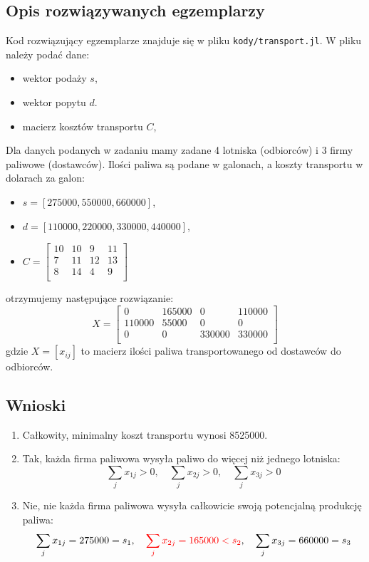 \documentclass[11pt,a4paper]{article}
\numberwithin{equation}{section}
\begin{document}
\subsection{Opis rozwiązywanych egzemplarzy}
Kod rozwiązujący egzemplarze znajduje się w pliku \texttt{kody/transport.jl}. W pliku należy podać dane: 
\begin{itemize}
    \item wektor podaży $s$,
    \item wektor popytu $d$.
    \item macierz kosztów transportu $C$,
\end{itemize}
Dla danych podanych w zadaniu mamy zadane 4 lotniska (odbiorców) i 3 firmy paliwowe (dostawców). Ilości paliwa są podane w galonach, a koszty transportu w dolarach za galon:
\begin{itemize}
    \item $s = [275000, 550000, 660000]$,
    \item $d = [110000, 220000, 330000, 440000]$,
    \item $
        C = \begin{bmatrix}
            10 &10&9&11 \\
            7&11&12&13 \\
            8&14&4&9\\
        \end{bmatrix}
        $
\end{itemize}
otrzymujemy następujące rozwiązanie:
    \[
        X = \begin{bmatrix}
            0 & 165000 & 0 & 110000 \\
            110000 & 55000 & 0 & 0 \\
            0 & 0 & 330000 & 330000 \\
        \end{bmatrix}
    \]
    gdzie $X=[x_{ij}]$ to macierz ilości paliwa transportowanego od dostawców do odbiorców. 

\subsection{Wnioski}
\begin{enumerate}[label=(\alph*)]
    \item Całkowity, minimalny koszt transportu wynosi \num{8525000}.
    \item Tak, każda firma paliwowa wysyła paliwo do więcej niż jednego lotniska:
        \[
            \sum_{j} x_{1j} > 0, \quad \sum_{j} x_{2j} > 0, \quad \sum_{j} x_{3j} > 0
        \]
    \item Nie, nie każda firma paliwowa wysyła całkowicie swoją potencjalną produkcję paliwa:
        \[
            \sum_{j} x_{1j} = 275000 = s_1, \quad \textcolor{red}{\sum_{j} x_{2j} = 165000 < s_2}, \quad \sum_{j} x_{3j} = 660000 = s_3
        \]
\end{enumerate}
\end{document}
